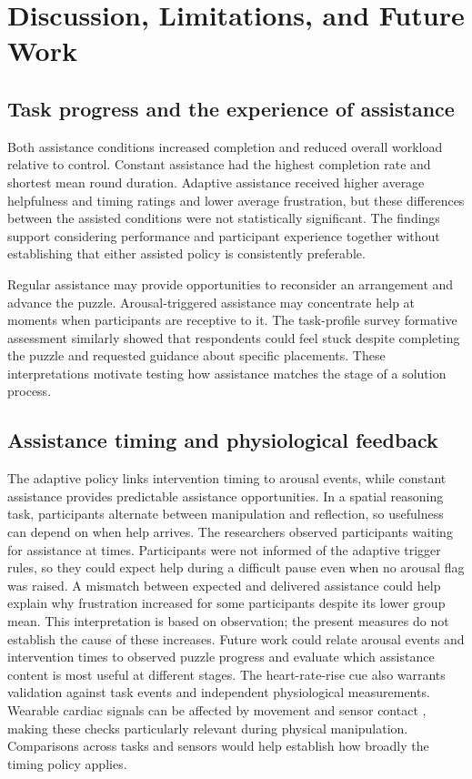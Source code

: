 \documentclass[sigconf,anonymous,balance=false]{aamas}
\providecommand{\DIFadd}[1]{{\protect\color{blue} \sf #1}} %
\providecommand{\DIFdel}[1]{{\protect\color{red} \scriptsize #1}} %
\providecommand{\DIFaddbegin}{} %
\providecommand{\DIFaddend}{} %
\providecommand{\DIFdelbegin}{} %
\providecommand{\DIFdelend}{} %
\begin{document}
\section{Discussion, Limitations, and Future Work}

\subsection{Task progress and the experience of assistance}

Both assistance conditions increased completion and reduced overall workload relative to control. Constant assistance had the highest completion rate and shortest mean round duration. Adaptive assistance received higher average helpfulness and timing ratings and lower average frustration, but these differences between the assisted conditions were not statistically significant. The findings support considering performance and participant experience together without establishing that either assisted policy is consistently preferable.

Regular assistance may provide opportunities to reconsider an arrangement and advance the puzzle. Arousal-triggered assistance may concentrate help at moments when participants are receptive to it. The \DIFdelbegin \DIFdel{task-profile survey }\DIFdelend \DIFaddbegin \DIFadd{formative assessment }\DIFaddend similarly showed that respondents could feel stuck despite completing the puzzle and requested guidance about specific placements. These interpretations motivate testing how assistance matches the stage of a solution process.

\subsection{Assistance timing and physiological feedback}

The adaptive policy links intervention timing to arousal events, while constant assistance provides predictable assistance opportunities. In a spatial reasoning task, participants alternate between manipulation and reflection, so usefulness can depend on when help arrives. \DIFaddbegin \DIFadd{The researchers observed participants waiting for assistance at times. Participants were not informed of the adaptive trigger rules, so they could expect help during a difficult pause even when no arousal flag was raised. A mismatch between expected and delivered assistance could help explain why frustration increased for some participants despite its lower group mean. This interpretation is based on observation; the present measures do not establish the cause of these increases. }\DIFaddend Future work could relate arousal events and intervention times to observed puzzle progress and evaluate which assistance content is most useful at different stages. \DIFaddbegin \DIFadd{The heart-rate-rise cue also warrants validation against task events and independent physiological measurements. Wearable cardiac signals can be affected by movement and sensor contact \cite{quigley2024}, making these checks particularly relevant during physical manipulation. }\DIFaddend Comparisons across tasks and sensors would help establish how broadly the timing policy applies.
\end{document}
